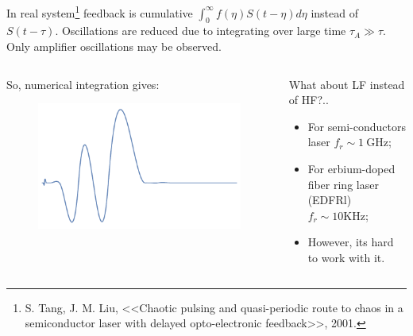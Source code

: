 In real system\footnote{
    S. Tang, J. M. Liu, <<Chaotic pulsing and quasi-periodic route to chaos in a semiconductor laser with delayed opto-electronic feedback>>, 2001.
} feedback is cumulative $ \int_{0}^{\infty} f(\eta) S(t-\eta)d\eta$ instead of $S(t-\tau)$. Oscillations are reduced due to integrating over large time $\tau_{A} \gg \tau$. Only amplifier oscillations may be observed.
 

 \begin{columns}
 	\begin{column}{.5\linewidth}
 		 So, numerical integration gives:
		 \begin{figure}
			\centering
			\includegraphics[width=.9\linewidth]{figures/int_oscillations.pdf}
		\end{figure}
 	\end{column}
 
 	\begin{column}{.5\linewidth}
 		What about LF instead of HF?..
 		\begin{itemize}
 			\item For semi-conductors laser $f_r \sim 1 \ \text{GHz}$;
 			\item For erbium-doped fiber ring laser (EDFRl) $f_r \sim 10 \text{KHz}$;
 			\item However, its hard to work with it.
 		\end{itemize}
	\end{column}
	\end{columns}
